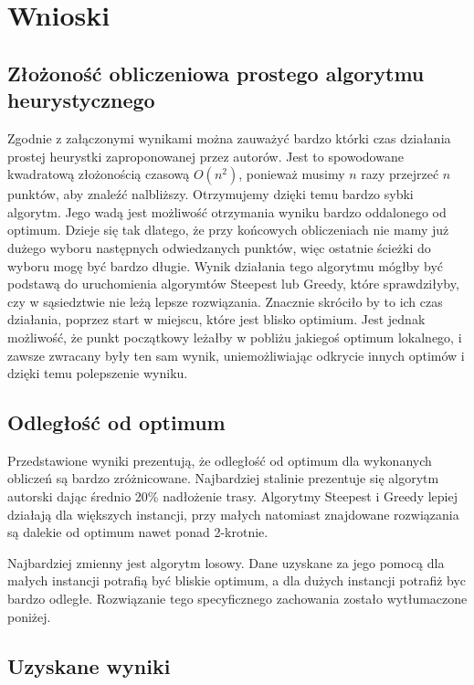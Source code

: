 \section{Wnioski}

\subsection{Złożoność obliczeniowa prostego algorytmu heurystycznego}

Zgodnie z załączonymi wynikami można zauważyć bardzo którki czas działania prostej
heurystki zaproponowanej przez autorów. Jest to spowodowane kwadratową złożonością 
czasową $ O(n^{2}) $, ponieważ musimy $ n $ razy przejrzeć $ n $ punktów, aby znaleźć
nalbliższy. Otrzymujemy dzięki temu bardzo sybki algorytm. Jego wadą jest 
możliwość otrzymania wyniku bardzo oddalonego od optimum. Dzieje się tak dlatego, 
że przy końcowych obliczeniach nie mamy już dużego wyboru następnych odwiedzanych 
punktów, więc ostatnie ścieżki do wyboru mogę być bardzo długie. Wynik działania 
tego algorytmu mógłby być podstawą do uruchomienia algorymtów Steepest lub Greedy, 
które sprawdziłyby, czy w sąsiedztwie nie leżą lepsze rozwiązania. Znacznie skróciło
by to ich czas działania, poprzez start w miejscu, które jest blisko optimium.
Jest jednak możliwość, że punkt początkowy leżałby w pobliżu jakiegoś optimum 
lokalnego, i zawsze zwracany były ten sam wynik, uniemożliwiając odkrycie innych 
optimów i dzięki temu polepszenie wyniku.

\subsection{Odległość od optimum}

Przedstawione wyniki prezentują, że odległość od optimum dla wykonanych obliczeń 
są bardzo zróżnicowane. Najbardziej stalinie prezentuje się algorytm autorski 
dając średnio 20\% nadłożenie trasy. Algorytmy Steepest i Greedy lepiej działają dla 
większych instancji, przy małych natomiast znajdowane rozwiązania są dalekie od optimum
nawet ponad 2-krotnie.

Najbardziej zmienny jest algorytm losowy. Dane uzyskane za jego pomocą dla małych instancji
potrafią być bliskie optimum, a dla dużych instancji potrafiż byc bardzo odległe. Rozwiązanie
tego specyficznego zachowania zostało wytłumaczone poniżej.

\subsection{Uzyskane wyniki}

